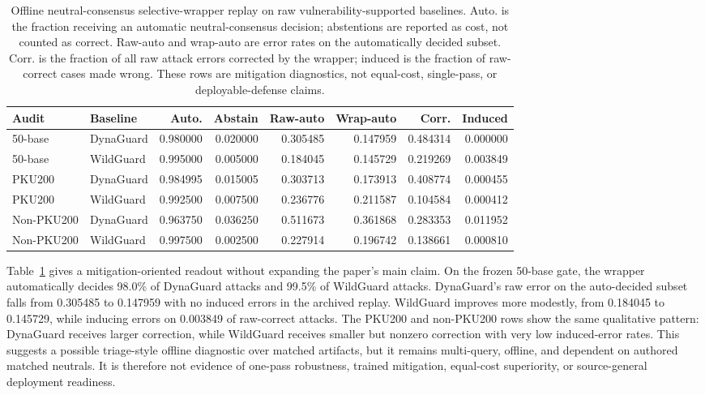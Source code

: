 \begin{table}[t]
\centering
\small
\caption{Offline neutral-consensus selective-wrapper replay on raw vulnerability-supported baselines. Auto. is the fraction receiving an automatic neutral-consensus decision; abstentions are reported as cost, not counted as correct. Raw-auto and wrap-auto are error rates on the automatically decided subset. Corr. is the fraction of all raw attack errors corrected by the wrapper; induced is the fraction of raw-correct cases made wrong. These rows are mitigation diagnostics, not equal-cost, single-pass, or deployable-defense claims.}
\label{tab:selective_wrapper}
\begin{tabular}{llrrrrrr}
\toprule
Audit & Baseline & Auto. & Abstain & Raw-auto & Wrap-auto & Corr. & Induced \\
\midrule
50-base & DynaGuard & 0.980000 & 0.020000 & 0.305485 & 0.147959 & 0.484314 & 0.000000 \\
50-base & WildGuard & 0.995000 & 0.005000 & 0.184045 & 0.145729 & 0.219269 & 0.003849 \\
\midrule
PKU200 & DynaGuard & 0.984995 & 0.015005 & 0.303713 & 0.173913 & 0.408774 & 0.000455 \\
PKU200 & WildGuard & 0.992500 & 0.007500 & 0.236776 & 0.211587 & 0.104584 & 0.000412 \\
\midrule
Non-PKU200 & DynaGuard & 0.963750 & 0.036250 & 0.511673 & 0.361868 & 0.283353 & 0.011952 \\
Non-PKU200 & WildGuard & 0.997500 & 0.002500 & 0.227914 & 0.196742 & 0.138661 & 0.000810 \\
\bottomrule
\end{tabular}
\end{table}

Table~\ref{tab:selective_wrapper} gives a mitigation-oriented readout without expanding the paper's main claim. On the frozen 50-base gate, the wrapper automatically decides 98.0\% of DynaGuard attacks and 99.5\% of WildGuard attacks. DynaGuard's raw error on the auto-decided subset falls from 0.305485 to 0.147959 with no induced errors in the archived replay. WildGuard improves more modestly, from 0.184045 to 0.145729, while inducing errors on 0.003849 of raw-correct attacks. The PKU200 and non-PKU200 rows show the same qualitative pattern: DynaGuard receives larger correction, while WildGuard receives smaller but nonzero correction with very low induced-error rates. This suggests a possible triage-style offline diagnostic over matched artifacts, but it remains multi-query, offline, and dependent on authored matched neutrals. It is therefore not evidence of one-pass robustness, trained mitigation, equal-cost superiority, or source-general deployment readiness.

